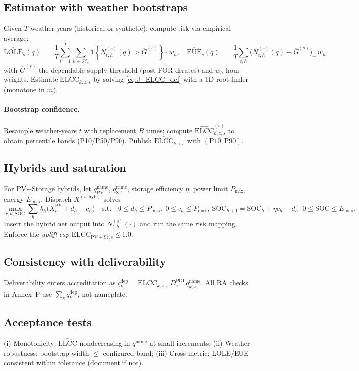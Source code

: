 \documentclass[11pt]{article}
\numberwithin{equation}{section}
\theoremstyle{definition}
\theoremstyle{remark}
\begin{document}
\subsection{ Estimator with weather bootstraps}
Given $T$ weather-years (historical or synthetic), compute risk via empirical average:
\[
\widehat{\mathrm{LOLE}}_s(q) \;=\; \frac{1}{T}\sum_{t=1}^{T}\!\sum_{h\in\mathcal{H}_s}
\mathbf{1}\!\left\{ N_{t,h}^{(s)}(q) > \overline{G}^{(s)} \right\}\cdot w_h,\quad
\widehat{\mathrm{EUE}}_s(q) \;=\; \frac{1}{T}\sum_{t,h}\!\big(N_{t,h}^{(s)}(q)-\overline{G}^{(s)}\big)_{+}\, w_h,
\]
with $\overline{G}^{(s)}$ the dependable supply threshold (post-FOR derates) and $w_h$ hour weights.
Estimate $\mathrm{ELCC}_{k,z,s}$ by solving \eqref{eq:J_ELCC_def} with a 1D root finder (monotone in $m$).

\paragraph{Bootstrap confidence.}
Resample weather-years $t$ with replacement $B$ times; compute $\widehat{\mathrm{ELCC}}^{(b)}_{k,z,s}$ to obtain percentile bands (P10/P50/P90). Publish $\widehat{\mathrm{ELCC}}_{k,z,s}$ with $(\text{P10},\text{P90})$.

\subsection{ Hybrids and saturation}
For PV+Storage hybrids, let $q^{\text{name}}_{\mathrm{PV}}$, $q^{\text{name}}_{\mathrm{ST}}$, storage efficiency $\eta$, power limit $P_{\max}$, energy $E_{\max}$. Dispatch $X^{(s,\mathrm{hyb})}$ solves
\[
\max_{c,d,\mathrm{SOC}} \sum_{h} \lambda_h \big(X^{\mathrm{PV}}_{h} + d_h - c_h\big) 
\quad\text{s.t.}\quad
0\le d_h\le P_{\max},\ 0\le c_h\le P_{\max},\ 
\mathrm{SOC}_{h+1}=\mathrm{SOC}_h + \eta c_h - d_h,\ 0\le \mathrm{SOC}\le E_{\max}.
\]
Insert the hybrid net output into $N_{t,h}^{(s)}(\cdot)$ and run the same risk mapping. Enforce the \emph{uplift cap} $\mathrm{ELCC}_{\mathrm{PV+St},s}\le 1.0$.

\subsection{ Consistency with deliverability}
Deliverability enters accreditation as $q_{k,z}^{\mathrm{dep}}=\mathrm{ELCC}_{k,z,s}\,D^{\mathrm{POI}}_{z}\,q^{\text{name}}_{k,z}$. All RA checks in Annex~F use $\sum_{k}q^{\mathrm{dep}}_{k,z}$, not nameplate.

\subsection{ Acceptance tests}
(i) Monotonicity: $\widehat{\mathrm{ELCC}}$ nondecreasing in $q^{\text{name}}$ at small increments; 
(ii) Weather robustness: bootstrap width $\le$ configured band; 
(iii) Cross-metric: LOLE/EUE consistent within tolerance (document if not).
\end{document}
